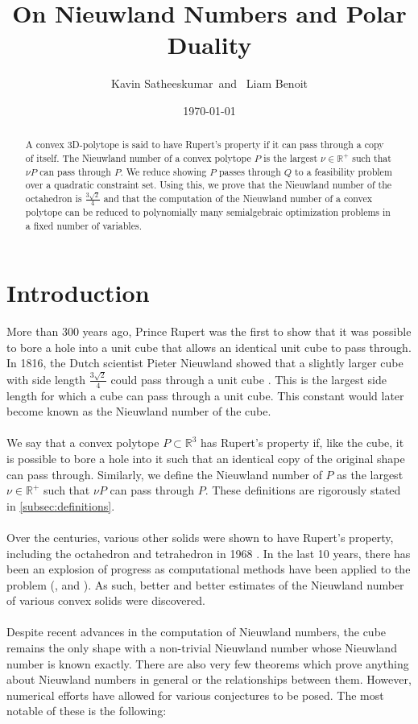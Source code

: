 \documentclass[a4paper]{amsart}
\title{On Nieuwland Numbers and Polar Duality}
\author{Kavin Satheeskumar\, and \, Liam Benoit}
\date{\today}
\theoremstyle{remark}
\begin{document}
\begin{abstract}
	\noindent
	A convex 3D-polytope is said to have Rupert's property if it can pass through a copy of itself. The Nieuwland number of a convex polytope $P$ is the largest $\nu \in \mathbb{R}^+$ such that $\nu P$ can pass through $P$. We reduce showing $P$ passes through $Q$ to a feasibility problem over a quadratic constraint set. Using this, we prove that the Nieuwland number of the octahedron is $\frac{3\sqrt2}{4}$ and that the computation of the Nieuwland number of a convex polytope can be reduced to polynomially many semialgebraic optimization problems in a fixed number of variables.
\end{abstract}



\maketitle

\section{Introduction} \label{sec:intro}

More than 300 years ago, Prince Rupert was the first to show that it was possible to bore a hole into a unit cube that allows an identical unit cube to pass through. In 1816, the Dutch scientist Pieter Nieuwland showed that a slightly larger cube with side length $\frac{3\sqrt{2}}{4}$ could pass through a unit cube \cite{BeGuHuJo21}. This is the largest side length for which a cube can pass through a unit cube. This constant would later become known as the Nieuwland number of the cube.\\\\
We say that a convex polytope $ P \subset \mathbb{R}^3$ has Rupert's property if, like the cube, it is possible to bore a hole into it such that an identical copy of the original shape can pass through. Similarly, we define the Nieuwland number of $P$ as the largest $\nu \in \mathbb{R}^+$ such that $\nu P$ can pass through $P$. These definitions are rigorously stated in \ref{subsec:definitions}.\\\\
Over the centuries, various other solids were shown to have Rupert's property, including the octahedron and tetrahedron in 1968 \cite{Scriba68}. In the last 10 years, there has been an explosion of progress as computational methods have been applied to the problem (\cite{Fe23}, \cite{StYu23} and \cite{StYu25}). As such, better and better estimates of the Nieuwland number of various convex solids were discovered.\\\\
Despite recent advances in the computation of Nieuwland numbers, the cube remains the only shape with a non-trivial Nieuwland number whose Nieuwland number is known exactly. There are also very few theorems which prove anything about Nieuwland numbers in general or the relationships between them. However, numerical efforts have allowed for various conjectures to be posed. The most notable of these is the following:
\end{document}
